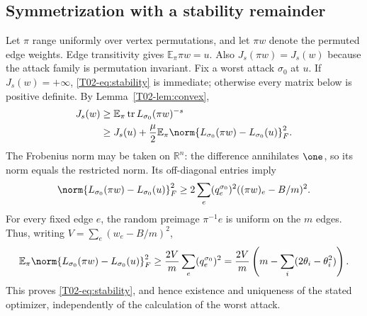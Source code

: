 \documentclass[11pt,a4paper]{article}
\theoremstyle{definition}\newtheorem{definition}[theorem]{Definition}
\theoremstyle{remark}\newtheorem{remark}[theorem]{Remark}
\newcommand{\R}{\mathbb R}\newcommand{\C}{\mathbb C}\newcommand{\N}{\mathbb N}
\DeclareMathOperator{\tr}{tr}\DeclareMathOperator{\supp}{supp}\DeclareMathOperator{\TV}{TV}
\numberwithin{equation}{section}
\begin{document}
\subsection{Symmetrization with a stability remainder}\label{T02-sec-3}
Let $\pi$ range uniformly over vertex permutations, and let $\pi w$ denote the permuted edge weights. Edge transitivity gives $\mathbb E_\pi\pi w=u$. Also $J_s(\pi w)=J_s(w)$ because the attack family is permutation invariant. Fix a worst attack $\sigma_0$ at $u$. If $J_s(w)=+\infty$, \eqref{T02-eq:stability} is immediate; otherwise every matrix below is positive definite. By Lemma~\ref{T02-lem:convex},
\begin{align*}
 J_s(w)&\ge\mathbb E_\pi\tr L_{\sigma_0}(\pi w)^{-s}\\
 &\ge J_s(u)+\frac\mu2\mathbb E_\pi
 \norm{L_{\sigma_0}(\pi w)-L_{\sigma_0}(u)}_F^2.
\end{align*}
The Frobenius norm may be taken on $\R^n$: the difference annihilates $\one$, so its norm equals the restricted norm. Its off-diagonal entries imply
\[
 \norm{L_{\sigma_0}(\pi w)-L_{\sigma_0}(u)}_F^2
 \ge2\sum_e(q_e^{\sigma_0})^2((\pi w)_e-B/m)^2.
\]
For every fixed edge $e$, the random preimage $\pi^{-1}e$ is uniform on the $m$ edges. Thus, writing $V=\sum_e(w_e-B/m)^2$,
\[
 \mathbb E_\pi\norm{L_{\sigma_0}(\pi w)-L_{\sigma_0}(u)}_F^2
 \ge\frac{2V}{m}\sum_e(q_e^{\sigma_0})^2
 =\frac{2V}{m}\left(m-\sum_i(2\theta_i-\theta_i^2)\right).
\]
This proves \eqref{T02-eq:stability}, and hence existence and uniqueness of the stated optimizer, independently of the calculation of the worst attack.
\end{document}
